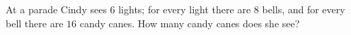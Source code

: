 At a parade Cindy sees $6$ lights; for every light there are $8$ bells, and for every bell there are $16$ candy canes. How many candy canes does she see?
